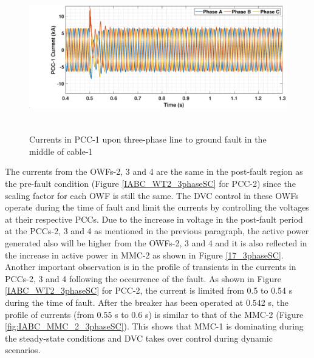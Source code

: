 \begin{figure}[H]
    \includegraphics[height = 6.5cm,width = \textwidth]{Diagrams/Chapter_5/IABC_WT1_3phaseSC.eps}
    \caption{Currents in PCC-1 upon three-phase line to ground fault in the middle of cable-1}
    \label{WT1_currents_3phasefault}
\end{figure}


The currents from the \gls{OWF}s-2, 3 and 4 are the same in the post-fault region as the pre-fault condition (Figure \ref{IABC_WT2_3phaseSC} for \gls{PCC}-2) since the scaling factor for each \gls{OWF} is still the same. The \gls{DVC} control in these \gls{OWF}s operate during the time of fault and limit the currents by controlling the voltages at their respective \gls{PCC}s. Due to the increase in voltage in the post-fault period at the \gls{PCC}s-2, 3 and 4 as mentioned in the previous paragraph, the active power generated also will be higher from the \gls{OWF}s-2, 3 and 4 and it is also reflected in the increase in active power in \gls{MMC}-2 as shown in Figure \ref{17_3phaseSC}. Another important observation is in the profile of transients in the currents in \gls{PCC}s-2, 3 and 4 following the occurrence of the fault. As shown in Figure \ref{IABC_WT2_3phaseSC} for \gls{PCC}-2, the current is limited from 0.5 to 0.54 s during the time of fault. After the breaker has been operated at 0.542 s, the profile of currents (from 0.55 s to 0.6 s) is similar to that of the \gls{MMC}-2 (Figure \ref{fig:IABC_MMC_2_3phaseSC}). This shows that \gls{MMC}-1 is dominating during the steady-state conditions and \gls{DVC} takes over control during dynamic scenarios.

